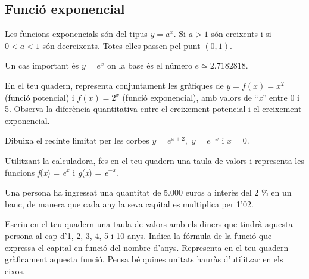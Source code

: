 \pagebreak
\subsection{Funció exponencial}

\begin{theorybox}
	Les funcions exponencials són del tipus $y=a^x$. Si $a>1$ són creixents i si $0<a<1$ són decreixents. Totes elles passen pel punt $(0, 1)$.
	
	Un cas important és $y=e^x$ on la base és el número $e \simeq 2.7182818$.
\end{theorybox}

\begin{mylist}
\exer  En el teu quadern, representa conjuntament les gràfiques de $y=f(x)=x^2$ (funció potencial) i $f(x)=2^x$ (funció exponencial), amb valors de ``\textit{x}'' entre 0 i 5. Observa la diferència quantitativa entre el creixement potencial i el creixement exponencial. 

\exer Dibuixa el recinte limitat per les corbes $y=e^{x+2} ,$ $y=e^{-x} $  i  $x=0.$

\exer  Utilitzant la calculadora, fes en el teu quadern una taula de valors i representa les funcions \textit{f}(\textit{x}) = \textit{e${}^{x}$}  i \textit{g}(\textit{x}) = \textit{e${}^{-}$${}^{x}$}.

\exer  Una persona ha ingressat una quantitat de 5.000 euros a interès del 2 \% en un banc, de manera que cada any la seva capital es multiplica per 1'02.
\begin{tasks}
\task  Escriu en el teu quadern una taula de valors amb els diners que tindrà aquesta persona al cap d'1, 2, 3, 4, 5 i 10 anys.
\task  Indica la fórmula de la funció que expressa el capital en funció del nombre d'anys.
\task  Representa en el teu quadern gràficament aquesta funció. Pensa bé quines unitats hauràs d'utilitzar en els eixos.
\end{tasks}
\answers{[\mbox{}\par\begin{tabular}{|c|c|c|c|c|c|c|}
		anys & 1 & 2 & 3 & 4 & 5 & 10 \\ \hline
	 k\euro{} & 5.1 & 5.202 & 5.306 & 5.41 & 5.52 & 6.09
	\end{tabular},
	$C=5\cdot 1.02^x$
]}



\end{mylist}
